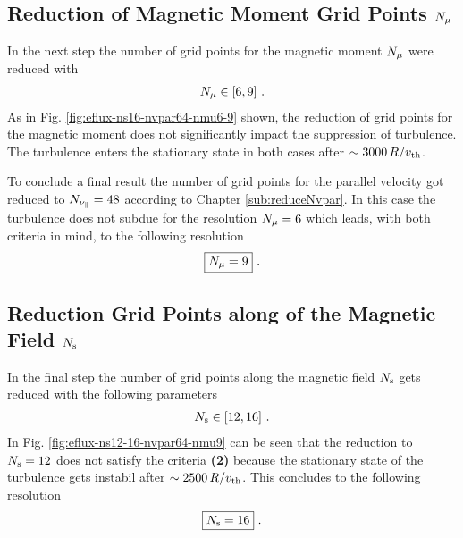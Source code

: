 \subsection{Reduction of Magnetic Moment Grid Points $N_\mu$}
\label{sub:reduceNmu}

In the next step the number of grid points for the magnetic moment $N_\mu$ were reduced with
\begin{gather*}
	N_\mu \in [6, 9] ~.
\end{gather*}
As in Fig. \ref{fig:eflux-ns16-nvpar64-nmu6-9} shown, the reduction of grid points for the magnetic moment does not significantly impact the suppression of turbulence. The turbulence enters the stationary state in both cases after $\sim 3000\,R/v_{\mathrm{th}}$.  


To conclude a final result the number of grid points for the parallel velocity got reduced to $N_{\nu_\parallel} = 48$ according to Chapter \ref{sub:reduceNvpar}. In this case the turbulence does not subdue for the resolution $N_\mu = 6$ which leads, with both criteria in mind, to the following resolution
\begin{gather*}
	\boxed{N_\mu = 9}~.
\end{gather*}


\subsection{Reduction Grid Points along of the Magnetic Field $N_\mathrm{s}$}
\label{sub:reduceNs}

In the final step the number of grid points along the magnetic field $N_\mathrm{s}$ gets reduced with the following parameters
\begin{gather*}
	N_\mathrm{s} \in [12, 16]~.
\end{gather*}
In Fig. \ref{fig:eflux-ns12-16-nvpar64-nmu9} can be seen that the reduction to $N_\mathrm{s} = 12$ does not satisfy the criteria \textbf{(2)} because the stationary state of the turbulence gets instabil after $\sim 2500\,R/v_{\mathrm{th}}$. This concludes to the following resolution
\begin{gather*}
	\boxed{N_\mathrm{s} = 16}~.
\end{gather*}

